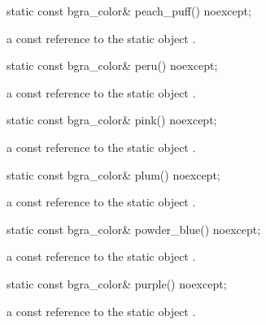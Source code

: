 \begin{itemdecl}
static const bgra_color& peach_puff() noexcept;
\end{itemdecl}
\begin{itemdescr}
\pnum
\returns
a const reference to the static  object .
\end{itemdescr}

\begin{itemdecl}
static const bgra_color& peru() noexcept;
\end{itemdecl}
\begin{itemdescr}
\pnum
\returns
a const reference to the static  object .
\end{itemdescr}

\begin{itemdecl}
static const bgra_color& pink() noexcept;
\end{itemdecl}
\begin{itemdescr}
\pnum
\returns
a const reference to the static  object .
\end{itemdescr}

\begin{itemdecl}
static const bgra_color& plum() noexcept;
\end{itemdecl}
\begin{itemdescr}
\pnum
\returns
a const reference to the static  object .
\end{itemdescr}

\begin{itemdecl}
static const bgra_color& powder_blue() noexcept;
\end{itemdecl}
\begin{itemdescr}
\pnum
\returns
a const reference to the static  object .
\end{itemdescr}

\begin{itemdecl}
static const bgra_color& purple() noexcept;
\end{itemdecl}
\begin{itemdescr}
\pnum
\returns
a const reference to the static  object .
\end{itemdescr}

